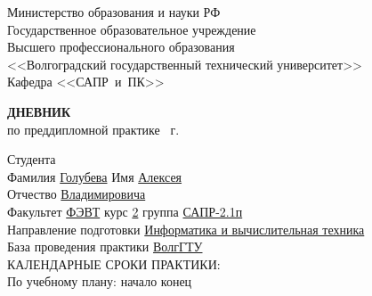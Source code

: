 \documentclass[a4paper, 14pt]{extreport}
\begin{document}
    \begin{titlepage}
        \begin{center}
            Министерство образования и науки РФ \\
            Государственное образовательное учреждение\\
            Высшего профессионального образования\\
            <<Волгоградский государственный технический университет>>\\
            Кафедра <<САПР~и~ПК>>
        \end{center}
        \vspace{2cm}
        \begin{center}
            \large \textbf{ДНЕВНИК} \\
            по преддипломной практике \the\year\ г.
        \end{center}
        \begin{flushleft}
            Студента\\
            Фамилия \underline{Голубева\hspace{3.1cm}} 
            Имя \underline{Алексея\hspace{2.1cm}}\\
            Отчество \underline{Владимировича\hspace{1.6cm}}\\
            Факультет \underline{ФЭВТ\hspace{3.45cm}} курс \underline{2\hspace{1.5cm}} 
            группа \underline{САПР-2.1п\hspace{2.6cm}}\\
            \vspace{1cm}
            Направление подготовки \underline{Информатика и вычислительная техника\hspace{2.6cm}}\\
            \underline{\hspace{\textwidth}}
            База проведения практики \underline{ВолгГТУ\hspace{9.1cm}}\\
            \underline{\hspace{\textwidth}}\vspace{1cm}
            КАЛЕНДАРНЫЕ СРОКИ ПРАКТИКИ:\\
            По учебному плану: \hspace{0.2cm} начало \underline{\hspace{4.5cm}} 
            конец \underline{\hspace{4.5cm}}\\

\end{flushleft}
\end{titlepage}
\end{document}
